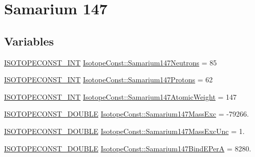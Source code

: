 \hypertarget{group___isotope_const-_samarium-_sm147}{}\section{Samarium 147}
\label{group___isotope_const-_samarium-_sm147}
\subsection*{Variables}
\begin{DoxyCompactItemize}
\item 
\mbox{\hyperlink{group___isotope_const-_macros_ga5f18360b3e99483a35c32d789e62621c}{I\+S\+O\+T\+O\+P\+E\+C\+O\+N\+S\+T\+\_\+\+I\+NT}} \mbox{\hyperlink{group___isotope_const-_samarium-_sm147_ga61a615c820760d5cecfe4249cd3c864c}{Isotope\+Const\+::\+Samarium147\+Neutrons}} = 85
\item 
\mbox{\hyperlink{group___isotope_const-_macros_ga5f18360b3e99483a35c32d789e62621c}{I\+S\+O\+T\+O\+P\+E\+C\+O\+N\+S\+T\+\_\+\+I\+NT}} \mbox{\hyperlink{group___isotope_const-_samarium-_sm147_ga08d4de69944309be1e4e5a78127f49b2}{Isotope\+Const\+::\+Samarium147\+Protons}} = 62
\item 
\mbox{\hyperlink{group___isotope_const-_macros_ga5f18360b3e99483a35c32d789e62621c}{I\+S\+O\+T\+O\+P\+E\+C\+O\+N\+S\+T\+\_\+\+I\+NT}} \mbox{\hyperlink{group___isotope_const-_samarium-_sm147_ga48e2a18c62aae601ae431b920f522fd8}{Isotope\+Const\+::\+Samarium147\+Atomic\+Weight}} = 147
\item 
\mbox{\hyperlink{group___isotope_const-_macros_ga8f45a7272ce02c0b4c65c44636ed719a}{I\+S\+O\+T\+O\+P\+E\+C\+O\+N\+S\+T\+\_\+\+D\+O\+U\+B\+LE}} \mbox{\hyperlink{group___isotope_const-_samarium-_sm147_ga0ec5a5707546124b97a530a0b1444a21}{Isotope\+Const\+::\+Samarium147\+Mass\+Exc}} = -\/79266.
\item 
\mbox{\hyperlink{group___isotope_const-_macros_ga8f45a7272ce02c0b4c65c44636ed719a}{I\+S\+O\+T\+O\+P\+E\+C\+O\+N\+S\+T\+\_\+\+D\+O\+U\+B\+LE}} \mbox{\hyperlink{group___isotope_const-_samarium-_sm147_ga158ce846770d397d95660585c18f8400}{Isotope\+Const\+::\+Samarium147\+Mass\+Exc\+Unc}} = 1.
\item 
\mbox{\hyperlink{group___isotope_const-_macros_ga8f45a7272ce02c0b4c65c44636ed719a}{I\+S\+O\+T\+O\+P\+E\+C\+O\+N\+S\+T\+\_\+\+D\+O\+U\+B\+LE}} \mbox{\hyperlink{group___isotope_const-_samarium-_sm147_ga185b07e72df0a849da297524a9d4016a}{Isotope\+Const\+::\+Samarium147\+Bind\+E\+PerA}} = 8280.
\item 

\end{DoxyCompactItemize}
